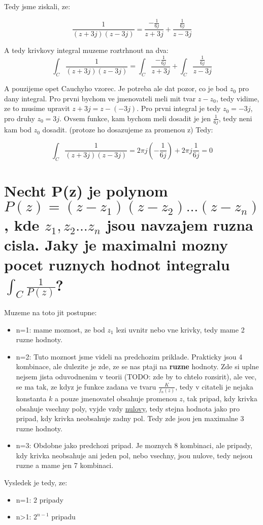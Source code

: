 Tedy jsme ziskali, ze:

$$\frac{1}{(z+3j)(z-3j)} = \frac{-\frac{1}{6j}}{z+3j} + \frac{\frac{1}{6j}}{z-3j}$$

A tedy krivkovy integral muzeme roztrhnout na dva:
$$\int_C \frac{1}{(z+3j)(z-3j)}  = \int_C \frac{-\frac{1}{6j}}{z+3j} + \int_C \frac{\frac{1}{6j}}{z-3j}$$

A pouzijeme opet Cauchyho vzorec. Je potreba ale dat pozor, co je bod $z_0$ pro dany integral. Pro prvni bychom ve jmenovateli meli mit tvar $z-z_0$, tedy vidime, ze to musime upravit $z+3j = z - (-3j)$. Pro prvni integral je tedy $z_0 = -3j$, pro druhy $z_0 =3j$. Ovsem funkce, kam bychom meli dosadit je jen $\frac{1}{6j}$, tedy neni kam bod $z_0$ dosadit. (protoze ho dosazujeme za promenou z) Tedy:

$$\int_C \frac{1}{(z+3j)(z-3j)} = 2\pi j\left( -\frac{1}{6j}\right) + 2\pi j \frac{1}{6j} = 0$$

\newpage

\section{Necht P(z) je polynom $P(z) = (z-z_1)(z-z_2)\dots(z-z_n)$, kde $z_1, z_2 \dots z_n$ jsou navzajem ruzna cisla. Jaky je maximalni mozny pocet ruznych hodnot integralu $\int_C \frac{1}{P(z)}$?}

Muzeme na toto jit postupne:
\begin{itemize}
\item n=1: mame moznost, ze bod $z_1$ lezi uvnitr nebo vne krivky, tedy mame 2 ruzne hodnoty.
\item n=2: Tuto moznost jsme videli na predchozim priklade. Prakticky jsou 4 kombinace, ale dulezite je zde, ze se nas ptaji na \textbf{ruzne} hodnoty. Zde si uplne nejsem jista oduvodnenim v teorii (TODO: zde by to chtelo rozsirit), ale vec, se ma tak, ze kdyz je funkce zadana ve tvaru $\frac{K}{f_n(z)}$, tedy v citateli je nejaka konstanta $k$ a pouze jmenovatel obsahuje promenou $z$, tak pripad, kdy krivka obsahuje vsechny poly, vyjde vzdy \underline{nulovy}, tedy stejna hodnota jako pro pripad, kdy krivka neobsahuje zadny pol. Tedy zde jsou jen maximalne 3 ruzne hodnoty.
\item n=3: Obdobne jako predchozi pripad. Je moznych 8 kombinaci, ale pripady, kdy krivka neobsahuje ani jeden pol, nebo vsechny, jsou nulove, tedy nejsou ruzne a mame jen 7 kombinaci.
\end{itemize}

Vysledek je tedy, ze:
\begin{itemize}
\item n=1: $2$ pripady
\item n>1: $2^{n-1}$ pripadu
\end{itemize}

